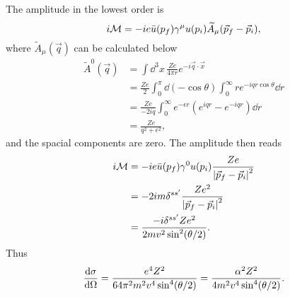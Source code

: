 \begin{problembody}
    \item The amplitude in the lowest order is
    \[
        i\mathcal{M} = -ie\bar u(p_f)\gamma^\mu u(p_i)\widetilde A_\mu(\vec p_f - \vec p_i),
    \]
    where $\widetilde{A}_\mu(\vec q)$ can be calculated below
    \begin{align*}
        \widetilde{A}^0(\vec q) & = \int \dd^3x \, \frac{Ze}{4\pi r} e^{-i\vec q\cdot\vec x}\\
        & = \frac{Ze}{2}\int_0^\pi \dd(-\cos\theta)\int_0^\infty r e^{-iqr\cos\theta} \dd r\\
        & = \frac{Ze}{-2iq}\int_0^\infty e^{-\epsilon r}\left(e^{iqr} - e^{-iqr}\right) \dd r\\
        & = \frac{Ze}{q^2 + \epsilon^2},
    \end{align*}
    and the spacial components are zero. The amplitude then reads
    \begin{align*}
        i\mathcal{M} & = -ie \bar u(p_f)\gamma^0u(p_i) \frac{Ze}{\left| \vec p_f - \vec p_i \right|^2}\\
        & = -2im \delta^{ss'} \frac{Ze^2}{\left| \vec p_f - \vec p_i \right|^2}\\
        & = \frac{-i\delta^{ss'}Ze^2}{2mv^2\sin^2(\theta / 2)}.
    \end{align*}
    Thus
    \[
        \frac{\mathrm{d} \sigma}{\mathrm{d} \Omega} = \frac{e^4Z^2}{64\pi^2 m^2 v^4 \sin^4(\theta / 2)}
        = \frac{\alpha^2Z^2}{4m^2 v^4 \sin^4(\theta / 2)}.    
    \]
\end{problembody}